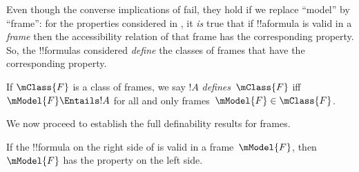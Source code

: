 \documentclass[../../../include/open-logic-section]{subfiles}
\begin{document}

Even though the converse implications of 
fail, they hold if we replace ``model'' by ``frame'': for the
properties considered in , it \emph{is}
true that if !!a{formula} is valid in a \emph{frame} then the
accessibility relation of that frame has the corresponding
property. So, the !!{formula}s considered \emph{define} the classes of
frames that have the corresponding property.

\begin{defn}
  If $\mClass{F}$ is a class of frames, we say $!A$
  \emph{defines}~$\mClass{F}$ iff $\mModel{F} \Entails !A$ for all and only
  frames~$\mModel{F} \in \mClass{F}$.
\end{defn}

We now proceed to establish the full definability results for
frames.

\begin{thm}
If the !!{formula} on the right side of  is valid in a
frame~$\mModel{F}$, then $\mModel{F}$ has the property on the left
side.
\end{thm}
\end{document}

